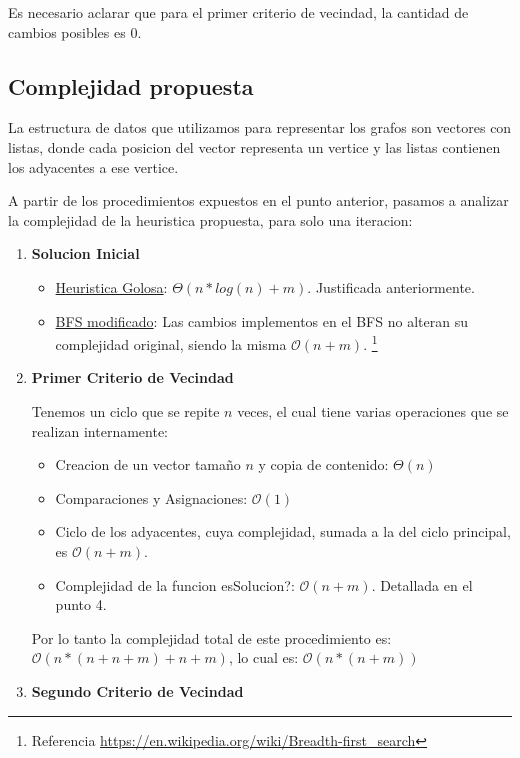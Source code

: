 Es necesario aclarar que para el primer criterio de vecindad, la cantidad de cambios posibles es 0.

\subsection{Complejidad propuesta}
La estructura de datos que utilizamos para representar los grafos son vectores con listas, donde cada posicion del vector representa un vertice y las listas contienen los adyacentes a ese vertice.

A partir de los procedimientos expuestos en el punto anterior, pasamos a analizar la complejidad de la heuristica propuesta, para solo una iteracion:

\begin{enumerate}
  \item \textbf{Solucion Inicial}
    \begin{itemize}
    	\item \underline{Heuristica Golosa}: $\Theta{(n*log(n) + m)}$. Justificada anteriormente.
        \item \underline{BFS modificado}: Las cambios implementos en el BFS no alteran su complejidad original, siendo la misma $\mathcal{O}(n + m)$. \footnote{Referencia \url{https://en.wikipedia.org/wiki/Breadth-first_search}}
    \end{itemize}
  \item \textbf{Primer Criterio de Vecindad}

  Tenemos un ciclo que se repite $n$ veces, el cual tiene varias operaciones que se realizan internamente:
  \begin{itemize}
    \item Creacion de un vector tamaño $n$ y copia de contenido: $\Theta{(n)}$
    \item Comparaciones y Asignaciones: $\mathcal{O}(1)$
    \item Ciclo de los adyacentes, cuya complejidad, sumada a la del ciclo principal, es $\mathcal{O}(n + m)$.
    \item Complejidad de la funcion esSolucion?: $\mathcal{O}(n + m)$. Detallada en el punto 4.
  \end{itemize}
  Por lo tanto la complejidad total de este procedimiento es: $\mathcal{O}(n*(n + n + m) + n + m)$, lo cual es: $\mathcal{O}(n*(n + m))$

  \item \textbf{Segundo Criterio de Vecindad}


\end{enumerate}
